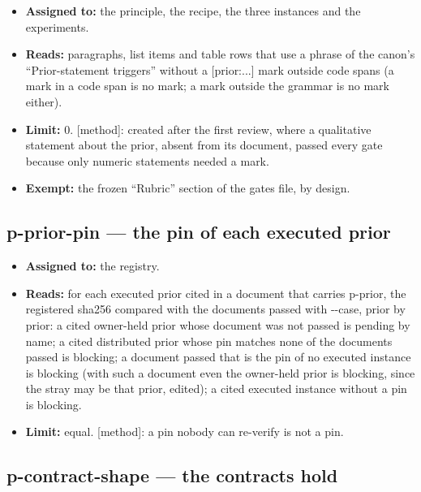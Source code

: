 \documentclass[
  american,
  10pt,
]{report}
\newcounter{none} %
\providecommand{\tightlist}{%
  \setlength{\itemsep}{0pt}\setlength{\parskip}{0pt}}
\renewcommand{\texttt}[1]{{\ttfamily\hyphenchar\font=-1 #1}}
\begin{document}
\begin{itemize}
\tightlist
\item
  \textbf{Assigned to:} the principle, the recipe, the three instances
  and the experiments.
\item
  \textbf{Reads:} paragraphs, list items and table rows that use a
  phrase of the canon's ``Prior-statement triggers'' without a
  \texttt{[prior:\allowbreak{}.\allowbreak{}.\allowbreak{}.\allowbreak{}]}
  mark outside code spans (a mark in a code span is no mark; a mark
  outside the grammar is no mark either).
\item
  \textbf{Limit:} 0. \texttt{[method]}: created after the first review,
  where a qualitative statement about the prior, absent from its
  document, passed every gate because only numeric statements needed a
  mark.
\item
  \textbf{Exempt:} the frozen ``Rubric'' section of the gates file, by
  design.
\end{itemize}

\subsection{\texorpdfstring{\texttt{p-\allowbreak{}prior-\allowbreak{}pin}
--- the pin of each executed
prior}{ --- the pin of each executed prior}}\label{p-prior-pin-the-pin-of-each-executed-prior}

\begin{itemize}
\tightlist
\item
  \textbf{Assigned to:} the registry.
\item
  \textbf{Reads:} for each executed prior cited in a document that
  carries \texttt{p-\allowbreak{}prior}, the registered sha256 compared
  with the documents passed with
  \texttt{-\allowbreak{}-\allowbreak{}case}, prior by prior: a cited
  owner-held prior whose document was not passed is pending by name; a
  cited distributed prior whose pin matches none of the documents passed
  is blocking; a document passed that is the pin of no executed instance
  is blocking (with such a document even the owner-held prior is
  blocking, since the stray may be that prior, edited); a cited executed
  instance without a pin is blocking.
\item
  \textbf{Limit:} equal. \texttt{[method]}: a pin nobody can re-verify
  is not a pin.
\end{itemize}

\subsection{\texorpdfstring{\texttt{p-\allowbreak{}contract-\allowbreak{}shape}
--- the contracts
hold}{ --- the contracts hold}}\label{p-contract-shape-the-contracts-hold}
\end{document}
